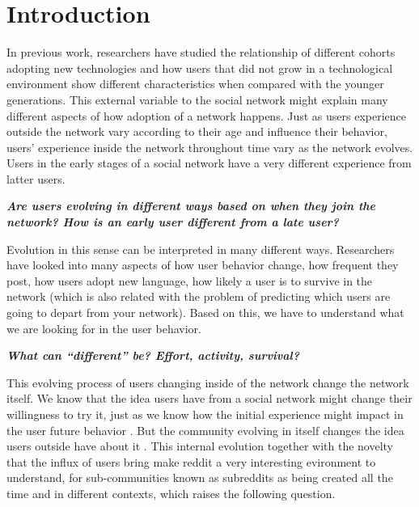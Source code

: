 \section{Introduction}

In previous work, researchers have studied the relationship of different cohorts adopting new technologies and how users that did not grow in a technological environment show different characteristics when compared with the younger generations. This external variable to the social network might explain many different aspects of how adoption of a network happens. Just as users experience outside the network vary according to their age and influence their behavior, users' experience inside the network throughout time vary as the network evolves. Users in the early stages of a social network have a very different experience from latter users.

\textbf{\textit{Are users evolving in different ways based on when they join the network? How is an early user different from a late user?}}

Evolution in this sense can be interpreted in many different ways. Researchers have looked into many aspects of how user behavior change, how frequent they post, how users adopt new language, how likely a user is to survive in the network (which is also related with the problem of predicting which users are going to depart from your network). Based on this, we have to understand what we are looking for in the user behavior.

\textbf{\textit{What can ``different'' be? Effort, activity, survival?}}

This evolving process of users changing inside of the network change the network itself. We know that the idea users have from a social network might change their willingness to try it, just as we know how the initial experience might impact in the user future behavior \cite{Miller2015}. But the community evolving in itself changes the idea users outside have about it \cite{Danescu-niculescu-mizil2013}. This internal evolution together with the novelty that the influx of users bring make reddit a very interesting evironment to understand, for sub-communities known as subreddits as being created all the time and in different contexts, which raises the following question.

